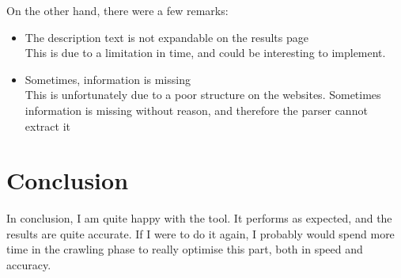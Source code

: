 \documentclass[a4paper]{article}
\begin{document}
\noindent On the other hand, there were a few remarks:
\begin{itemize}
\item The description text is not expandable on the results page\\
This is due to a limitation in time, and could be interesting to implement.
\item Sometimes, information is missing\\
This is unfortunately due to a poor structure on the websites. Sometimes information is missing without reason, and therefore the parser cannot extract it
\end{itemize}

\section{Conclusion}
In conclusion, I am quite happy with the tool. It performs as expected, and the results are quite accurate. If I were to do it again, I probably would spend more time in the crawling phase to really optimise this part, both in speed and accuracy. 
\end{document}
